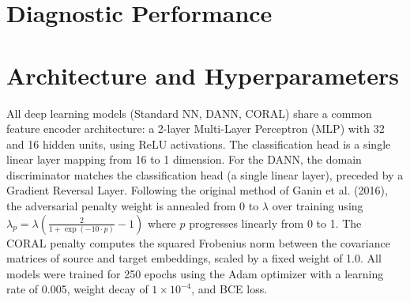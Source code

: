 \documentclass{article}
\begin{document}
\appendix
\label{sec:appendix}

\section{Diagnostic Performance} \label{sec:diagnostic}
\begin{table}[htbp]\footnotesize
\centering
\caption{Model Performance under Random (Scheme A) and UDA (Scheme B) Splits. Mean $\pm$ Std (20 seeds).}
\label{tab:main}
\end{table}
\section{Architecture and Hyperparameters} \label{sec:appendix}
All deep learning models (Standard NN, DANN, CORAL) share a common feature encoder architecture: a 2-layer Multi-Layer Perceptron (MLP) with 32 and 16 hidden units, using ReLU activations. The classification head is a single linear layer mapping from 16 to 1 dimension. For the DANN, the domain discriminator matches the classification head (a single linear layer), preceded by a Gradient Reversal Layer. Following the original method of Ganin et al. (2016), the adversarial penalty weight is annealed from 0 to $\lambda$ over training using $\lambda_p = \lambda \left(\frac{2}{1 + \exp(-10 \cdot p)} - 1\right)$ where $p$ progresses linearly from 0 to 1. The CORAL penalty computes the squared Frobenius norm between the covariance matrices of source and target embeddings, scaled by a fixed weight of 1.0. All models were trained for 250 epochs using the Adam optimizer with a learning rate of 0.005, weight decay of $1\times 10^{-4}$, and BCE loss.
\end{document}
